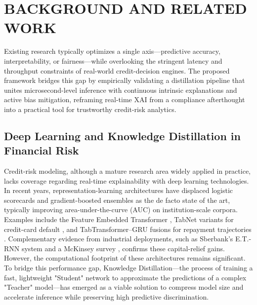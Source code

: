 \documentclass{wscpaperproc}
\theoremstyle{wsc}
\begin{document}
\section{BACKGROUND AND RELATED WORK}
Existing research typically optimizes a single axis—predictive accuracy, interpretability, or fairness—while overlooking the stringent latency and throughput constraints of real-world credit-decision engines. The proposed framework bridges this gap by empirically validating a distillation pipeline that unites microsecond-level inference with continuous intrinsic explanations and active bias mitigation, reframing real-time XAI from a compliance afterthought into a practical tool for trustworthy credit-risk analytics.
\subsection{Deep Learning and Knowledge Distillation in Financial Risk}
Credit-risk modeling, although a mature research area widely applied in practice, lacks coverage regarding real-time explainability with deep learning technologies. In recent years, representation-learning architectures have displaced logistic scorecards and gradient-boosted ensembles as the de facto state of the art, typically improving area-under-the-curve (AUC) on institution-scale corpora. Examples include the Feature Embedded Transformer \cite{wang2022fetransformer}, TabNet variants for credit-card default \cite{Nguyen2024TabNetCredit}, and TabTransformer–GRU fusions for repayment trajectories \cite{Zhang2024HomeCreditGRU}. Complementary evidence from industrial deployments, such as Sberbank’s E.T.-RNN system \cite{Babaev2019ETRNN} and a McKinsey survey \cite{McKinsey2021CreditModels}, confirms these capital-relief gains. However, the computational footprint of these architectures remains significant. To bridge this performance gap, Knowledge Distillation—the process of training a fast, lightweight "Student" network to approximate the predictions of a complex "Teacher" model—has emerged as a viable solution to compress model size and accelerate inference while preserving high predictive discrimination.
\end{document}
